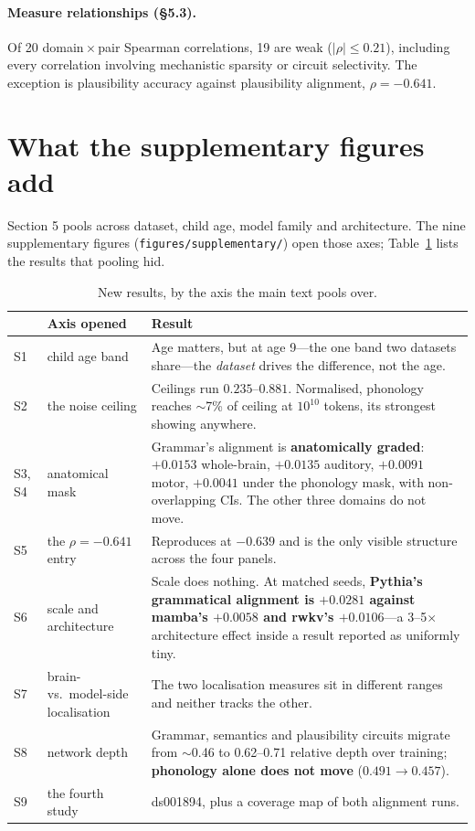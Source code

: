 \documentclass[11pt]{article}
\begin{document}
\paragraph{Measure relationships (\S5.3).} Of 20 domain\,$\times$\,pair
Spearman correlations, 19 are weak ($|\rho| \le 0.21$), including every
correlation involving mechanistic sparsity or circuit selectivity. The
exception is plausibility accuracy against plausibility alignment,
$\rho = -0.641$.

\section{What the supplementary figures add}

Section 5 pools across dataset, child age, model family and architecture. The
nine supplementary figures (\texttt{figures/supplementary/}) open those axes;
Table~\ref{tab:new} lists the results that pooling hid.

\begin{table}[h]
\centering\small
\begin{tabular}{@{}llp{7.4cm}@{}}
\toprule
& Axis opened & Result \\
\midrule
S1 & child age band & Age matters, but at age 9---the one band two datasets
share---the \emph{dataset} drives the difference, not the age. \\
S2 & the noise ceiling & Ceilings run $0.235$--$0.881$. Normalised,
phonology reaches $\sim$7\% of ceiling at $10^{10}$ tokens, its strongest
showing anywhere. \\
S3, S4 & anatomical mask & Grammar's alignment is \textbf{anatomically
graded}: $+0.0153$ whole-brain, $+0.0135$ auditory, $+0.0091$ motor,
$+0.0041$ under the phonology mask, with non-overlapping CIs. The other three
domains do not move. \\
S5 & the $\rho=-0.641$ entry & Reproduces at $-0.639$ and is the only visible
structure across the four panels. \\
S6 & scale and architecture & Scale does nothing. At matched seeds,
\textbf{Pythia's grammatical alignment is $+0.0281$ against mamba's $+0.0058$
and rwkv's $+0.0106$}---a 3--5$\times$ architecture effect inside a result
reported as uniformly tiny. \\
S7 & brain- vs.\ model-side localisation & The two localisation measures sit
in different ranges and neither tracks the other. \\
S8 & network depth & Grammar, semantics and plausibility circuits migrate
from $\sim$0.46 to 0.62--0.71 relative depth over training;
\textbf{phonology alone does not move} ($0.491 \to 0.457$). \\
S9 & the fourth study & ds001894, plus a coverage map of both alignment runs. \\
\bottomrule
\end{tabular}
\caption{New results, by the axis the main text pools over.}
\label{tab:new}
\end{table}
\end{document}
